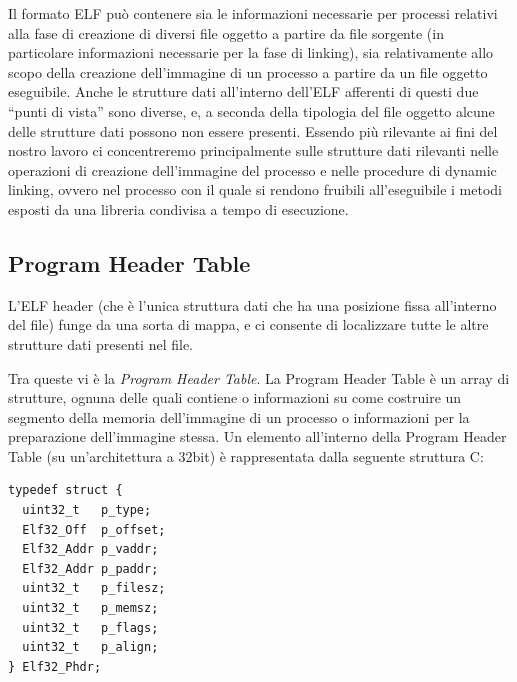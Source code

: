 Il formato ELF può contenere sia le informazioni necessarie per
processi relativi alla fase di creazione di diversi file oggetto a
partire da file sorgente (in particolare informazioni necessarie per
la fase di linking), sia relativamente allo scopo della creazione
dell'immagine di un processo a partire da un file oggetto
eseguibile. Anche le strutture dati all'interno dell'ELF afferenti di
questi due ``punti di vista'' sono diverse, e, a seconda della
tipologia del file oggetto alcune delle strutture dati possono non
essere presenti. Essendo più rilevante ai fini del nostro lavoro ci
concentreremo principalmente sulle strutture dati rilevanti nelle
operazioni di creazione dell'immagine del processo e nelle procedure
di dynamic linking, ovvero nel processo con il quale si rendono
fruibili all'eseguibile i metodi esposti da una libreria condivisa a
tempo di esecuzione.

\subsection{Program Header Table}
\label{sec:plt}

L'ELF header (che è l'unica struttura dati che ha una posizione fissa
all'interno del file) funge da una sorta di mappa, e ci consente di
localizzare tutte le altre strutture dati presenti nel file.

Tra queste vi è la \emph{Program Header Table}. La Program Header
Table è un array di strutture, ognuna delle quali contiene o
informazioni su come costruire un segmento della memoria dell'immagine
di un processo o informazioni per la preparazione dell'immagine
stessa. Un elemento all'interno della Program Header Table (su
un'architettura a 32bit) è rappresentata dalla seguente struttura C:

\begin{lstlisting}[caption=Program Header Table entry]
typedef struct {
  uint32_t   p_type;
  Elf32_Off  p_offset;
  Elf32_Addr p_vaddr;
  Elf32_Addr p_paddr;
  uint32_t   p_filesz;
  uint32_t   p_memsz;
  uint32_t   p_flags;
  uint32_t   p_align;
} Elf32_Phdr;
\end{lstlisting}

